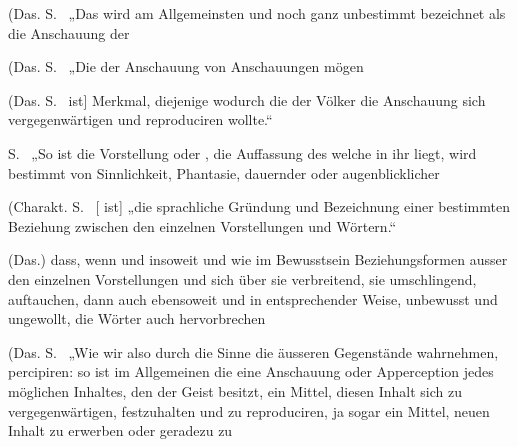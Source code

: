 (Das. S.~ „Das  wird am Allgemeinsten und noch ganz unbestimmt bezeichnet als die Anschauung der 

(Das. S.~ „Die  der Anschauung von Anschauungen mögen  

(Das. S.~ \arbup{1889}{lsDarkBlue}{„[\so{Innere}}{[\so{Innere}}  ist]  Merkmal, diejenige  wodurch die  der Völker die Anschauung sich vergegenwärtigen und reproduciren wollte.“

\label{fp.322}

 S.~ „So ist die Vorstellung oder ,  die Auffassung des  welche in ihr liegt, wird bestimmt von Sinnlichkeit, Phantasie, dauernder oder augenblicklicher 

(Charakt. S.~ [ ist] „die sprachliche Gründung und Bezeichnung einer bestimmten Beziehung zwischen den einzelnen Vorstellungen und Wörtern.“

(Das.)  dass, wenn und insoweit und wie im Bewusstsein Beziehungsformen ausser den einzelnen Vorstellungen und sich über sie verbreitend, sie umschlingend, auftauchen, dann auch ebensoweit und in entsprechender Weise, unbewusst und ungewollt, die Wörter auch  hervorbrechen 

(Das. S.~ „Wie wir also durch die Sinne die äusseren Gegenstände wahrnehmen, percipiren: so ist im Allgemeinen die  eine Anschauung oder Apperception jedes möglichen Inhaltes, den der Geist besitzt, ein Mittel, diesen Inhalt sich zu vergegenwärtigen, festzuhalten und zu reproduciren, ja sogar ein Mittel, neuen Inhalt zu erwerben oder geradezu zu 

